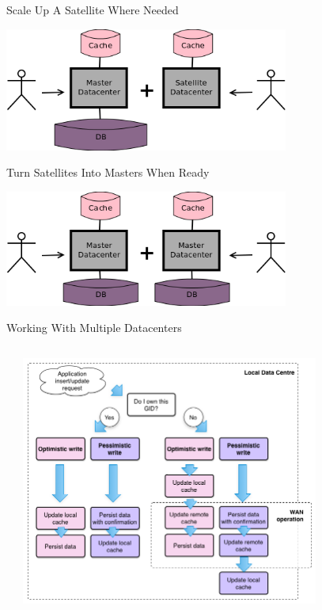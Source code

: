 \documentclass[aspectratio=169]{beamer}
\begin{document}
\begin{frame}{Scale Up A Satellite Where Needed}
    \begin{center}
        \includegraphics[width=0.7\textwidth]{images/scalingdcs2.png}
    \end{center}
\end{frame}

\begin{frame}{Turn Satellites Into Masters When Ready}
    \begin{center}
        \includegraphics[width=0.7\textwidth]{images/scalingdcs3.png}
    \end{center}
\end{frame}

\begin{frame}{Working With Multiple Datacenters}
    \begin{columns}
        \begin{column}[c]{0.1\textwidth}
        \end{column}
        \begin{column}[c]{0.8\textwidth}
            \includegraphics[width=0.8\textwidth]{images/multidcops.png}
        \end{column}
        \begin{column}[c]{0.1\textwidth}
        \end{column}
    \end{columns}
\end{frame}
\end{document}

